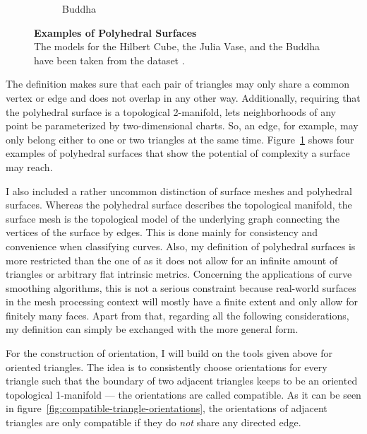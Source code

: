 \documentclass{stdlocal}
\begin{document}
\begin{figure}[t]
\begin{subfigure}[b]{0.23\linewidth}
      \caption{Buddha}
    \end{subfigure}
    \caption[Examples of Polyhedral Surfaces]{%
      \textbf{Examples of Polyhedral Surfaces}\\
      The models for the Hilbert Cube, the Julia Vase, and the Buddha have been taken from the  dataset \autocite{thingi10k}.
    }
    \label{fig:polyhedral-surface-examples}
  \end{figure}

  \noindent
  The definition makes sure that each pair of triangles may only share a common vertex or edge and does not overlap in any other way.
  Additionally, requiring that the polyhedral surface is a topological 2-manifold, lets neighborhoods of any point be parameterized by two-dimensional charts.
  So, an edge, for example, may only belong either to one or two triangles at the same time.
  Figure~\ref{fig:polyhedral-surface-examples} shows four examples of polyhedral surfaces that show the potential of complexity a surface may reach.

  I also included a rather uncommon distinction of surface meshes and polyhedral surfaces.
  Whereas the polyhedral surface describes the topological manifold, the surface mesh is the topological model of the underlying graph connecting the vertices of the surface by edges.
  This is done mainly for consistency and convenience when classifying curves.
  Also, my definition of polyhedral surfaces is more restricted than the one of \textcite{polthier2006} as it does not allow for an infinite amount of triangles or arbitrary flat intrinsic metrics.
  Concerning the applications of curve smoothing algorithms, this is not a serious constraint because real-world surfaces in the mesh processing context will mostly have a finite extent and only allow for finitely many faces.
  Apart from that, regarding all the following considerations, my definition can simply be exchanged with the more general form.

  For the construction of orientation, I will build on the tools given above for oriented triangles.
  The idea is to consistently choose orientations for every triangle such that the boundary of two adjacent triangles keeps to be an oriented topological 1-manifold --- the orientations are called compatible.
  As it can be seen in figure~\ref{fig:compatible-triangle-orientations}, the orientations of adjacent triangles are only compatible if they do \textit{not} share any directed edge.
\end{document}

